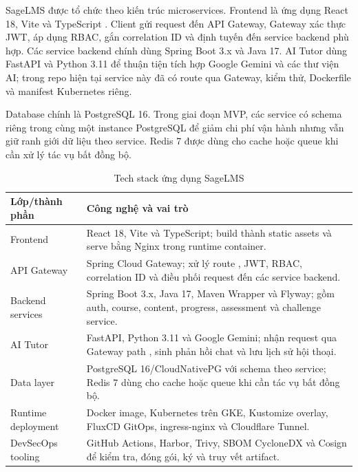 SageLMS được tổ chức theo kiến trúc microservices. Frontend là ứng dụng React 18, Vite và TypeScript \cite{reactDocs,viteDocs}. Client gửi request đến API Gateway, Gateway xác thực JWT, áp dụng RBAC, gắn correlation ID và định tuyến đến service backend phù hợp. Các service backend chính dùng Spring Boot 3.x và Java 17. AI Tutor dùng FastAPI và Python 3.11 để thuận tiện tích hợp Google Gemini và các thư viện AI; trong repo hiện tại service này đã có route qua Gateway, kiểm thử, Dockerfile và manifest Kubernetes riêng.

Database chính là PostgreSQL 16. Trong giai đoạn MVP, các service có schema riêng trong cùng một instance PostgreSQL để giảm chi phí vận hành nhưng vẫn giữ ranh giới dữ liệu theo service. Redis 7 được dùng cho cache hoặc queue khi cần xử lý tác vụ bất đồng bộ.

\begin{table}[H]
\centering
\caption{Tech stack ứng dụng SageLMS}
\label{tab:application-tech-stack}
\begin{tabularx}{\textwidth}{|p{}|Y|}
\hline
\textbf{Lớp/thành phần} & \textbf{Công nghệ và vai trò} \\
\hline
Frontend & React 18, Vite và TypeScript; build thành static assets và serve bằng Nginx trong runtime container. \\
API Gateway & Spring Cloud Gateway; xử lý route , JWT, RBAC, correlation ID và điều phối request đến các service backend. \\
Backend services & Spring Boot 3.x, Java 17, Maven Wrapper và Flyway; gồm auth, course, content, progress, assessment và challenge service. \\
AI Tutor & FastAPI, Python 3.11 và Google Gemini; nhận request qua Gateway path , sinh phản hồi chat và lưu lịch sử hội thoại. \\
Data layer & PostgreSQL 16/CloudNativePG với schema theo service; Redis 7 dùng cho cache hoặc queue khi cần tác vụ bất đồng bộ. \\
Runtime deployment & Docker image, Kubernetes trên GKE, Kustomize overlay, FluxCD GitOps, ingress-nginx và Cloudflare Tunnel. \\
DevSecOps tooling & GitHub Actions, Harbor, Trivy, SBOM CycloneDX và Cosign để kiểm tra, đóng gói, ký và truy vết artifact. \\
\hline
\end{tabularx}
\end{table}

